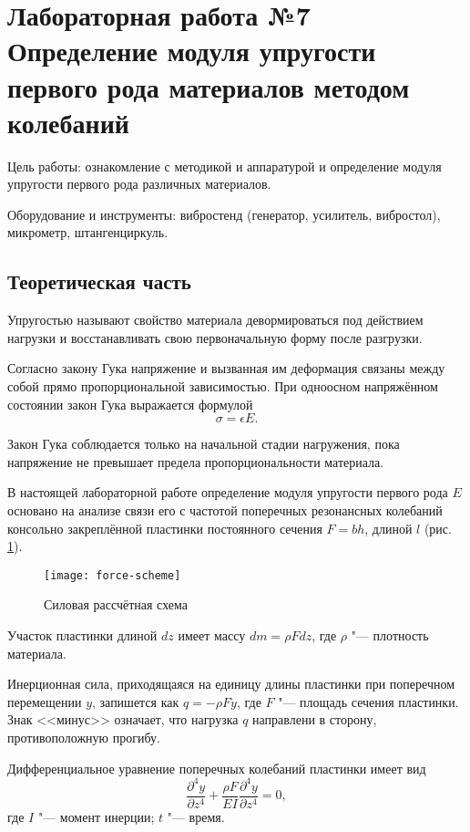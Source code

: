 \section{Лабораторная работа №7 \\
\Large Определение модуля упругости первого рода материалов методом колебаний}

Цель работы: ознакомление с методикой и аппаратурой и определение модуля упругости первого рода различных материалов.

Оборудование и инструменты: вибростенд (генератор, усилитель, вибростол), микрометр, штангенциркуль.

\subsection{Теоретическая часть}

Упругостью называют свойство материала девормироваться под действием нагрузки и восстанавливать свою первоначальную форму после разгрузки.

Согласно закону Гука напряжение и вызванная им деформация связаны между собой прямо пропорциональной зависимостью.
При одноосном напряжённом состоянии закон Гука выражается формулой
\[
    \sigma = \epsilon E.
\]

Закон Гука соблюдается только на начальной стадии нагружения, пока напряжение не превышает предела пропорциональности материала.

В настоящей лабораторной работе определение модуля упругости первого рода $E$ основано на анализе связи его с частотой поперечных резонансных колебаний консольно закреплённой пластинки постоянного сечения $F = bh$, длиной $l$ (рис. \ref{fig:force-scheme}).

\begin{figure}[!ht]
    \centering
    \texttt{[image: force-scheme]}
    \caption{Силовая рассчётная схема}
    \label{fig:force-scheme}
\end{figure}

Участок пластинки длиной $dz$ имеет массу $dm = \rho F dz$, где $\rho$ "--- плотность материала.

Инерционная сила, приходящаяся на единицу длины пластинки при поперечном перемещении $y$, запишется как $q = -\rho F \ddot{y}$, где $F$ "--- площадь сечения пластинки.
Знак <<минус>> означает, что нагрузка $q$ направлени в сторону, противоположную прогибу.

Дифференциальное уравнение поперечных колебаний пластинки имеет вид
\begin{equation}\label{eq:partial-equation}
    \frac{\partial^4 y}{\partial z^4} + \frac{\rho F}{E I} \frac{\partial^4 y}{\partial z^4} = 0,
\end{equation}
где $I$ "--- момент инерции; $t$ "--- время.

